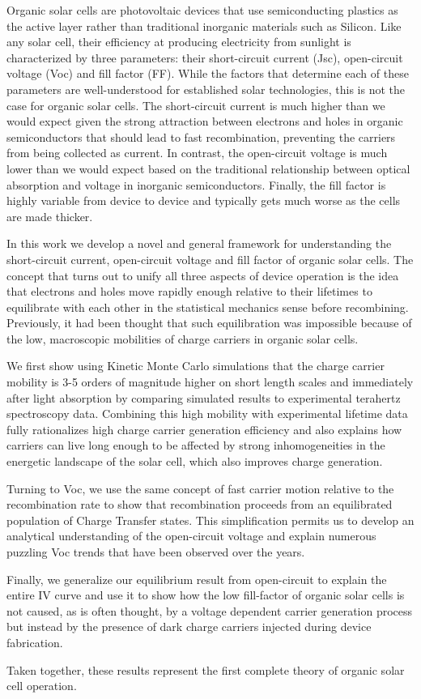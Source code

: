 
Organic solar cells are photovoltaic devices that use semiconducting plastics as the active layer rather than traditional inorganic materials such as Silicon.  Like any solar cell, their efficiency at producing electricity from sunlight is characterized by three parameters: their short-circuit current (Jsc), open-circuit voltage (Voc) and fill factor (FF).   While the factors that determine each of these parameters are well-understood for established solar technologies, this is not the case for organic solar cells.  The short-circuit current is much higher than we would expect given the strong attraction between electrons and holes in organic semiconductors that should lead to fast recombination, preventing the carriers from being collected as current.  In contrast, the open-circuit voltage is much lower than we would expect based on the traditional relationship between optical absorption and voltage in inorganic semiconductors.  Finally, the fill factor is highly variable from device to device and typically gets much worse as the cells are made thicker.

In this work we develop a novel and general framework for understanding the short-circuit current, open-circuit voltage and fill factor of organic solar cells.  The concept that turns out to unify all three aspects of device operation is the idea that electrons and holes move rapidly enough relative to their lifetimes to equilibrate with each other in the statistical mechanics sense before recombining.  Previously, it had been thought that such equilibration was impossible because of the low, macroscopic mobilities of charge carriers in organic solar cells.

We first show using Kinetic Monte Carlo simulations that the charge carrier mobility is 3-5 orders of magnitude higher on short length scales and immediately after light absorption by comparing simulated results to experimental terahertz spectroscopy data.  Combining this high mobility with experimental lifetime data fully rationalizes high charge carrier generation efficiency and also explains how carriers can live long enough to be affected by strong inhomogeneities in the energetic landscape of the solar cell, which also improves charge generation.  

Turning to Voc, we use the same concept of fast carrier motion relative to the recombination rate to show that recombination proceeds from an equilibrated population of Charge Transfer states.  This simplification permits us to develop an analytical understanding of the open-circuit voltage and explain numerous puzzling Voc trends that have been observed over the years.

Finally, we generalize our equilibrium result from open-circuit to explain the entire IV curve and use it to show how the low fill-factor of organic solar cells is not caused, as is often thought, by a voltage dependent carrier generation process but instead by the presence of dark charge carriers injected during device fabrication.  

Taken together, these results represent the first complete theory of organic solar cell operation.